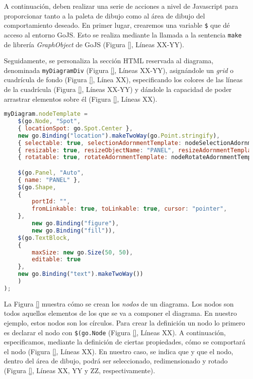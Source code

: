 A continuación, deben realizar una serie de acciones a nivel de Javascript para proporcionar tanto a la paleta de dibujo como al área de dibujo del comportamiento deseado. En primer lugar, crearemos una variable \texttt{\$} que dé acceso al entorno GoJS. Esto se realiza mediante la llamada a la sentencia \texttt{make} de librería \emph{GraphObject} de GoJS (Figura \ref{}, Líneas XX-YY).

Seguidamente, se personaliza la sección HTML reservada al diagrama, denominada \texttt{myDiagramDiv} (Figura \ref{}, Líneas XX-YY), asignándole un \emph{grid} o cuadrícula de fondo (Figura \ref{}, Línea XX), especificando los colores de las líneas de la cuadrícula (Figura \ref{}, Líneas XX-YY) y dándole la capacidad de poder arrastrar elementos sobre él (Figura \ref{}, Líneas XX).


\begin{lstlisting}[language=JavaScript]
myDiagram.nodeTemplate =
	$(go.Node, "Spot",
	{ locationSpot: go.Spot.Center },
	new go.Binding("location").makeTwoWay(go.Point.stringify),
	{ selectable: true, selectionAdornmentTemplate: nodeSelectionAdornmentTemplate },
	{ resizable: true, resizeObjectName: "PANEL", resizeAdornmentTemplate: nodeResizeAdornmentTemplate },
	{ rotatable: true, rotateAdornmentTemplate: nodeRotateAdornmentTemplate },

	$(go.Panel, "Auto",
	{ name: "PANEL" },
	$(go.Shape,  
	{
		portId: "", 
		fromLinkable: true, toLinkable: true, cursor: "pointer",
	},
		new go.Binding("figure"),
		new go.Binding("fill")),
	$(go.TextBlock,
	{
		maxSize: new go.Size(50, 50),
		editable: true
	},
	new go.Binding("text").makeTwoWay())
	)
);
\end{lstlisting}


La Figura \ref{} muestra cómo se crean los \emph{nodos} de un diagrama. Los nodos son todos aquellos elementos de los que se va a componer el diagrama. En nuestro ejemplo, estos nodos son los círculos. Para crear la definición un nodo lo primero es declarar el nodo con \texttt{\$(go.Node} (Figura \ref{}, Líneas XX). A continuación, especificamos, mediante la definición de ciertas propiedades, cómo se comportará el nodo (Figura \ref{}, Líneas XX). En nuestro caso, se indica que %
y que el nodo, dentro del área de dibujo, podrá ser seleccionado, redimensionado y rotado (Figura \ref{}, Líneas XX, YY y ZZ, respectivamente).

